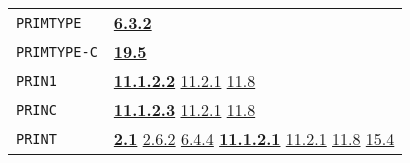 \documentclass[a4paper]{scrbook}
\begin{document}
\begin{longtable}[]{@{}ll@{}}
\begin{minipage}[t]{0.24\columnwidth}\raggedright\strut
\texttt{PRIMTYPE}\strut
\end{minipage} & \begin{minipage}[t]{0.70\columnwidth}\raggedright\strut
\textbf{\href{06-data-types.md\#632-primtype-1}{6.3.2}}\strut
\end{minipage}\tabularnewline
\begin{minipage}[t]{0.24\columnwidth}\raggedright\strut
\texttt{PRIMTYPE-C}\strut
\end{minipage} & \begin{minipage}[t]{0.70\columnwidth}\raggedright\strut
\textbf{\href{19-compiled-programs.md\#195-type-c-and-type-w}{19.5}}\strut
\end{minipage}\tabularnewline
\begin{minipage}[t]{0.24\columnwidth}\raggedright\strut
\texttt{PRIN1}\strut
\end{minipage} & \begin{minipage}[t]{0.70\columnwidth}\raggedright\strut
\textbf{\href{11-input-output.md\#11122-prin1}{11.1.2.2}} \href{11-input-output.md\#1121-open}{11.2.1}
\href{11-input-output.md\#118-terminal-channels}{11.8}\strut
\end{minipage}\tabularnewline
\begin{minipage}[t]{0.24\columnwidth}\raggedright\strut
\texttt{PRINC}\strut
\end{minipage} & \begin{minipage}[t]{0.70\columnwidth}\raggedright\strut
\textbf{\href{11-input-output.md\#11123-princ}{11.1.2.3}} \href{11-input-output.md\#1121-open}{11.2.1}
\href{11-input-output.md\#118-terminal-channels}{11.8}\strut
\end{minipage}\tabularnewline
\begin{minipage}[t]{0.24\columnwidth}\raggedright\strut
\texttt{PRINT}\strut
\end{minipage} & \begin{minipage}[t]{0.70\columnwidth}\raggedright\strut
\textbf{\href{02-read-evaluate-print.md\#21-general-1}{2.1}}
\href{02-read-evaluate-print.md\#262-read-and-print-versus-floating-point-numbers}{2.6.2}
\href{06-data-types.md\#644-printtype-evaltype-and-applytype}{6.4.4}
\textbf{\href{11-input-output.md\#11121-print}{11.1.2.1}} \href{11-input-output.md\#1121-open}{11.2.1}
\href{11-input-output.md\#118-terminal-channels}{11.8} \href{15-lexical-blocking.md\#154-print-and-oblists}{15.4}\strut
\end{minipage}\tabularnewline

\end{longtable}
\end{document}

